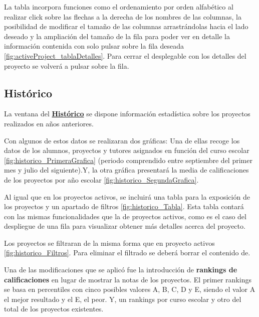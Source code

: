 La tabla incorpora funciones como el ordenamiento por orden alfabético al realizar click sobre las flechas a la derecha de los nombres de las columnas, la posibilidad de modificar el tamaño de las columnas arrastrándolas hacia el lado deseado y la ampliación del tamaño de la fila para poder ver en detalle la información contenida con solo pulsar sobre la fila deseada \ref{fig:activeProject_tablaDetalles}. Para cerrar el desplegable con los detalles del proyecto se volverá a pulsar sobre la fila.


\subsection{Histórico} 
La ventana del \textbf{\href{https://gestor-tfg-2021.herokuapp.com/Historic}{Histórico}} se dispone información estadística sobre los proyectos realizados en años anteriores. 

Con algunos de estos datos se realizaran dos gráficas: Una de ellas recoge los datos de los alumnos, proyectos y tutores asignados en función del curso escolar \ref{fig:historico_PrimeraGrafica} (periodo comprendido entre septiembre del primer mes y julio del siguiente).Y, la otra gráfica presentará la media de calificaciones de los proyectos por año escolar \ref{fig:historico_SegundaGrafica}.



Al igual que en los proyectos activos, se incluirá una tabla para la exposición de los proyectos y un apartado de filtros \ref{fig:historico_Tabla}. Esta tabla contará con las mismas funcionalidades que la de proyectos activos, como es el caso del despliegue de una fila para visualizar obtener más detalles acerca del proyecto. 

Los proyectos se filtraran de la misma forma que en proyecto activos \ref{fig:historico_Filtros}. Para eliminar el filtrado se deberá borrar el contenido de.

Una de las modificaciones que se aplicó fue la introducción de \textbf{rankings de calificaciones} en lugar de mostrar la notas de los proyectos. El primer rankings se basa en percentiles con cinco posibles valores A, B, C, D y E, siendo el valor A el mejor resultado y el E, el peor. Y, un rankings por curso escolar y otro del total de los proyectos existentes.

